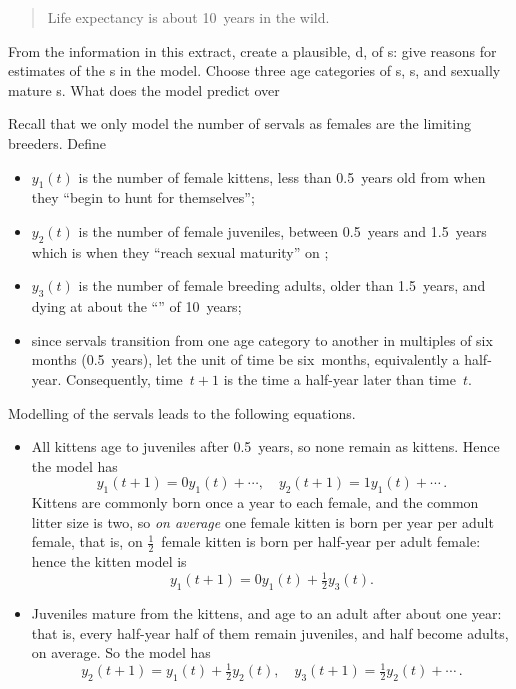 \begin{example}
\begin{quote}
Life expectancy is about 10~years in the wild.
\end{quote}
From the information in this extract, create a plausible, d,   of s: give reasons for estimates of the s in the model.
Choose three age categories of s, s, and sexually mature s.
What does the model predict over 
\begin{solution} 
Recall that we only model the number of \emph{} servals as females are the limiting breeders.
Define 
\begin{itemize}
\item \(y_1(t)\) is the number of female kittens, less than 0.5~years old from when they ``begin to hunt for themselves'';
\item \(y_2(t)\) is the number of female juveniles, between 0.5~years and 1.5~years which is when they ``reach sexual maturity'' on ;
\item \(y_3(t)\) is the number of female breeding adults, older than 1.5~years, and dying at about the ``'' of 10~years;
\item since servals transition from one age category to another in multiples of six months (0.5~years), let the unit of time be six~months, equivalently a half-year.  
Consequently, time~\(t+1\) is the time a half-year later than time~\(t\).
\end{itemize}
Modelling of the servals leads to the following equations.
\begin{itemize}
\item All kittens age to juveniles after 0.5~years, so none remain as kittens.  
Hence the model has 
\begin{equation*}
y_1(t+1)=0y_1(t)+\cdots,\quad
y_2(t+1)=1y_1(t)+\cdots\,.
\end{equation*}
Kittens are commonly born once a year to each female, and the common litter size is two, so \emph{on average} one female kitten is born per year per adult female, that is, on  \(\frac12\)~female kitten is born per half-year per adult female: hence the kitten model is
\begin{equation*}
y_1(t+1)=0y_1(t)+\tfrac12y_3(t).
\end{equation*}

\item Juveniles mature from the kittens, and age to an adult after about one year: that is, every half-year half of them remain juveniles, and half become adults, on average.
So the model has 
\begin{equation*}
y_2(t+1)=y_1(t)+\tfrac12y_2(t),\quad
y_3(t+1)=\tfrac12y_2(t)+\cdots\,.
\end{equation*}


\end{itemize}
\end{solution}
\end{example}
